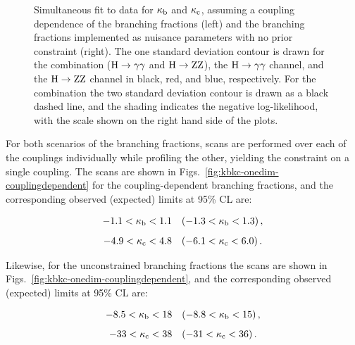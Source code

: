 \begin{figure}[hbtp]
\begin{center}
{        }
    \caption{
        Simultaneous fit to data for $\kappa_{\mathrm{b}}$ and $\kappa_{\mathrm{c}}$, assuming a coupling dependence of the branching fractions (left) and the branching fractions implemented as nuisance parameters with no prior constraint (right).
        The one standard deviation contour is drawn for the combination ($\mathrm{H}\to\mathrm{\gamma}\mathrm{\gamma}$ and $\mathrm{H}\to\mathrm{Z}\mathrm{Z}$), the $\mathrm{H}\to\mathrm{\gamma}\mathrm{\gamma}$ channel, and the $\mathrm{H}\to\mathrm{Z}\mathrm{Z}$ channel in black, red, and blue, respectively.
        For the combination the two standard deviation contour is drawn as a black dashed line, and the shading indicates the negative log-likelihood, with the scale shown on the right hand side of the plots.
        }
    \label{fig:kbkc}
  \end{center}
\end{figure}


For both scenarios of the branching fractions, scans are performed over each of the couplings individually while profiling the other, yielding the constraint on a single coupling.
% 
The scans are shown in Figs.~\ref{fig:kbkc-onedim-couplingdependent} for the coupling-dependent branching fractions, and the corresponding observed (expected) limits at 95\% CL are:
% 
\begin{linenomath*}
\begin{equation}
\label{eq:kappasensitivity}
\begin{array}{c}
-1.1 < \kappa_{\mathrm{b}} < 1.1  \quad(-1.3 < \kappa_{\mathrm{b}} < 1.3 )  \,,
\\[8pt]
-4.9 < \kappa_{\mathrm{c}} < 4.8 \quad(-6.1 < \kappa_{\mathrm{c}} < 6.0 )
\,.
\end{array}
\end{equation}
\end{linenomath*}
% 
Likewise, for the unconstrained branching fractions the scans are shown in Figs.~\ref{fig:kbkc-onedim-couplingdependent}, and the corresponding observed (expected) limits at 95\% CL are:
% 
\begin{linenomath*}
\begin{equation}
\label{eq:kappasensitivity_floatingBRs}
\begin{array}{c}
-8.5 < \kappa_{\mathrm{b}} < 18  \quad(-8.8 < \kappa_{\mathrm{b}} < 15 )  \,,
\\[8pt]
-33 < \kappa_{\mathrm{c}} < 38 \quad(-31 < \kappa_{\mathrm{c}} < 36 )
\,.
\end{array}
\end{equation}
\end{linenomath*}
